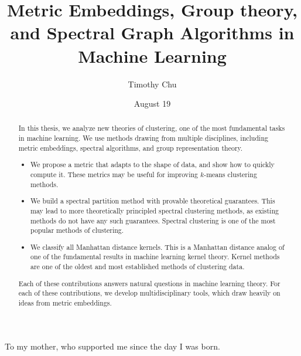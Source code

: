 \documentclass[12pt]{cmuthesis}
\begin{document}
 
\frontmatter

\pagestyle{empty}

\title{ 
{\bf Metric Embeddings, Group theory, and Spectral Graph Algorithms in Machine Learning}}
\author{Timothy Chu}
\date{August 19}
\trnumber{}


\support{}
\disclaimer{}



\maketitle

\begin{dedication}
To my mother, who supported me since the day I was born.
\end{dedication}

\pagestyle{plain} %


\begin{abstract}
  In this thesis, we analyze new theories of clustering,
  one of the most fundamental tasks in machine learning. We use methods
  drawing from multiple disciplines, including metric embeddings,
  spectral algorithms, and group representation theory.
  \begin{itemize}
    \item We propose a metric that adapts to the shape of data, and show
      how to quickly compute it. These metrics may be useful for
      improving $k$-means clustering methods.
    \item We build a spectral partition method with provable theoretical
      guarantees. This may lead to more theoretically principled
      spectral clustering methods, as existing methods do not have any
      such guarantees. Spectral clustering is one of the most popular
      methods of clustering.
    \item We classify all Manhattan distance kernels. This
      is a Manhattan distance analog of one of the fundamental results
      in machine learning kernel theory. Kernel methods are one of the
      oldest and most established methods of clustering data.
  \end{itemize}
  Each of these contributions answers natural questions in machine
  learning theory. For each of these contributions, we develop
  multidisciplinary tools, which draw heavily on ideas from metric
  embeddings. 

\end{abstract}
\iffalse
\end{document}
